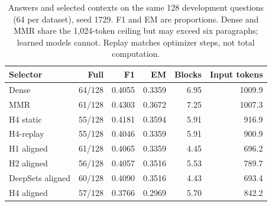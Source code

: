 \begin{table}[t]
\centering\small
\caption{Answers and selected contexts on the same 128 development questions (64 per dataset), seed 1729. F1 and EM are proportions. Dense and MMR share the 1,024-token ceiling but may exceed six paragraphs; learned models cannot. Replay matches optimizer steps, not total computation.}\label{tab:qa}
\begin{tabular}{lrrrrr}\toprule
Selector & Full & F1 & EM & Blocks & Input tokens \\
\midrule
Dense & 64/128 & 0.4055 & 0.3359 & 6.95 & 1009.9 \\
MMR & 61/128 & 0.4303 & 0.3672 & 7.25 & 1007.3 \\
H4 static & 55/128 & 0.4181 & 0.3594 & 5.91 & 916.9 \\
H4-replay & 55/128 & 0.4046 & 0.3359 & 5.91 & 900.9 \\
H1 aligned & 61/128 & 0.4065 & 0.3359 & 4.45 & 696.2 \\
H2 aligned & 56/128 & 0.4057 & 0.3516 & 5.53 & 789.7 \\
DeepSets aligned & 60/128 & 0.4090 & 0.3516 & 4.43 & 693.4 \\
H4 aligned & 57/128 & 0.3766 & 0.2969 & 5.70 & 842.2 \\
\bottomrule\end{tabular}
\end{table}
